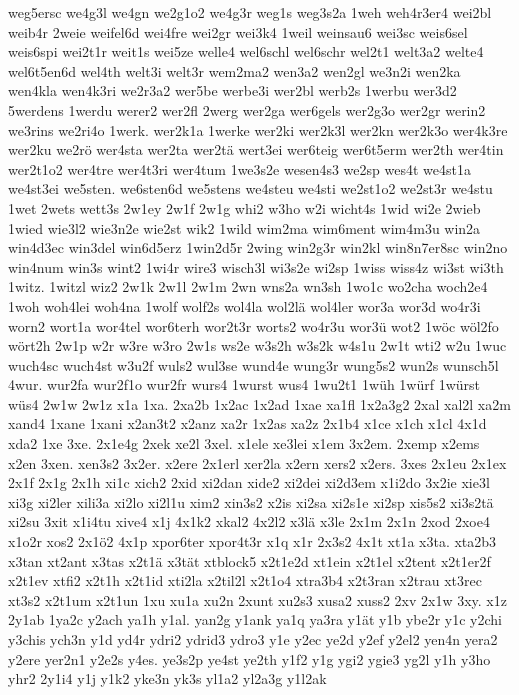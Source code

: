 {weg5ersc
we4g3l
we4gn
we2g1o2
we4g3r
weg1s
weg3s2a
1weh
weh4r3er4
wei2bl
weib4r
2weie
weifel6d
wei4fre
wei2gr
wei3k4
1weil
weinsau6
wei3sc
weis6sel
weis6spi
wei2t1r
weit1s
wei5ze
welle4
wel6schl
wel6schr
wel2t1
welt3a2
welte4
wel6t5en6d
wel4th
welt3i
welt3r
wem2ma2
wen3a2
wen2gl
we3n2i
wen2ka
wen4kla
wen4k3ri
we2r3a2
wer5be
werbe3i
wer2bl
werb2s
1werbu
wer3d2
5werdens
1werdu
werer2
wer2fl
2werg
wer2ga
wer6gels
wer2g3o
wer2gr
werin2
we3rins
we2ri4o
1werk.
wer2k1a
1werke
wer2ki
wer2k3l
wer2kn
wer2k3o
wer4k3re
wer2ku
we2rö
wer4sta
wer2ta
wer2tä
wert3ei
wer6teig
wer6t5erm
wer2th
wer4tin
wer2t1o2
wer4tre
wer4t3ri
wer4tum
1we3s2e
wesen4s3
we2sp
wes4t
we4st1a
we4st3ei
we5sten.
we6sten6d
we5stens
we4steu
we4sti
we2st1o2
we2st3r
we4stu
1wet
2wets
wett3s
2w1ey
2w1f
2w1g
whi2
w3ho
w2i
wicht4s
1wid
wi2e
2wieb
1wied
wie3l2
wie3n2e
wie2st
wik2
1wild
wim2ma
wim6ment
wim4m3u
win2a
win4d3ec
win3del
win6d5erz
1win2d5r
2wing
win2g3r
win2kl
win8n7er8sc
win2no
win4num
win3s
wint2
1wi4r
wire3
wisch3l
wi3s2e
wi2sp
1wiss
wiss4z
wi3st
wi3th
1witz.
1witzl
wiz2
2w1k
2w1l
2w1m
2wn
wns2a
wn3sh
1wo1c
wo2cha
woch2e4
1woh
woh4lei
woh4na
1wolf
wolf2s
wol4la
wol2lä
wol4ler
wor3a
wor3d
wo4r3i
worn2
wort1a
wor4tel
wor6terh
wor2t3r
worts2
wo4r3u
wor3ü
wot2
1wöc
wöl2fo
wört2h
2w1p
w2r
w3re
w3ro
2w1s
ws2e
w3s2h
w3s2k
w4s1u
2w1t
wti2
w2u
1wuc
wuch4sc
wuch4st
w3u2f
wuls2
wul3se
wund4e
wung3r
wung5s2
wun2s
wunsch5l
4wur.
wur2fa
wur2f1o
wur2fr
wurs4
1wurst
wus4
1wu2t1
1wüh
1würf
1würst
wüs4
2w1w
2w1z
x1a
1xa.
2xa2b
1x2ac
1x2ad
1xae
xa1fl
1x2a3g2
2xal
xal2l
xa2m
xand4
1xane
1xani
x2an3t2
x2anz
xa2r
1x2as
xa2z
2x1b4
x1ce
x1ch
x1cl
4x1d
xda2
1xe
3xe.
2x1e4g
2xek
xe2l
3xel.
x1ele
xe3lei
x1em
3x2em.
2xemp
x2ems
x2en
3xen.
xen3s2
3x2er.
x2ere
2x1erl
xer2la
x2ern
xers2
x2ers.
3xes
2x1eu
2x1ex
2x1f
2x1g
2x1h
xi1c
xich2
2xid
xi2dan
xide2
xi2dei
xi2d3em
x1i2do
3x2ie
xie3l
xi3g
xi2ler
xili3a
xi2lo
xi2l1u
xim2
xin3s2
x2is
xi2sa
xi2s1e
xi2sp
xis5s2
xi3s2tä
xi2su
3xit
x1i4tu
xive4
x1j
4x1k2
xkal2
4x2l2
x3lä
x3le
2x1m
2x1n
2xod
2xoe4
x1o2r
xos2
2x1ö2
4x1p
xpor6ter
xpor4t3r
x1q
x1r
2x3s2
4x1t
xt1a
x3ta.
xta2b3
x3tan
xt2ant
x3tas
x2t1ä
x3tät
xtblock5
x2t1e2d
xt1ein
x2t1el
x2tent
x2t1er2f
x2t1ev
xtfi2
x2t1h
x2t1id
xti2la
x2til2l
x2t1o4
xtra3b4
x2t3ran
x2trau
xt3rec
xt3s2
x2t1um
x2t1un
1xu
xu1a
xu2n
2xunt
xu2s3
xusa2
xuss2
2xv
2x1w
3xy.
x1z
2y1ab
1ya2c
y2ach
ya1h
y1al.
yan2g
y1ank
ya1q
ya3ra
y1ät
y1b
ybe2r
y1c
y2chi
y3chis
ych3n
y1d
yd4r
ydri2
ydrid3
ydro3
y1e
y2ec
ye2d
y2ef
y2el2
yen4n
yera2
y2ere
yer2n1
y2e2s
y4es.
ye3s2p
ye4st
ye2th
y1f2
y1g
ygi2
ygie3
yg2l
y1h
y3ho
yhr2
2y1i4
y1j
y1k2
yke3n
yk3s
yl1a2
yl2a3g
y1l2ak
}
